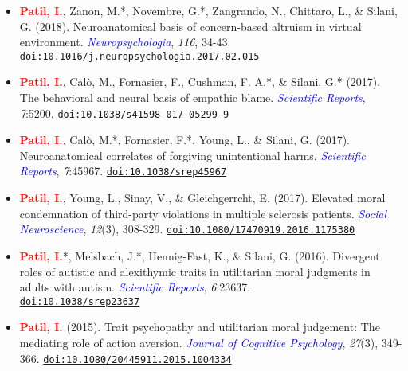 \documentclass[10pt]{article}
\begin{document}
\begin{itemize}
	\item \textbf{\textcolor{red}{Patil, I.}}, Zanon, M.*, Novembre, G.*, Zangrando, N., Chittaro, L., \& Silani, G. (2018). Neuroanatomical basis of concern-based altruism in virtual environment. \textit{\textcolor{blue}{Neuropsychologia}}, \textit{116}, 34-43. \href{https://drive.google.com/open?id=0B6_u70YpdJKnWU0zblpBOUMxRXc}{\tt doi:10.1016/j.neuropsychologia.2017.02.015}
		
	\item \textbf{\textcolor{red}{Patil, I.}}, Cal\`{o}, M., Fornasier, F., Cushman, F. A.*, \& Silani, G.* (2017). The behavioral and neural basis of empathic blame. 
 \textit{\textcolor{blue}{Scientific Reports}}, \textit{7}:5200. \href{https://drive.google.com/open?id=0B6_u70YpdJKnT1J6dkk5R1NPZDg}{\tt doi:10.1038/s41598-017-05299-9}
	
	\item \textbf{\textcolor{red}{Patil, I.}}, Cal\`{o}, M.*, Fornasier, F.*, Young, L., \& Silani, G. (2017). Neuroanatomical correlates of forgiving unintentional harms. \textit{\textcolor{blue}{Scientific Reports}}, \textit{7}:45967. \href{https://drive.google.com/open?id=0B6_u70YpdJKnRV81UnNlZHdrdXM}{\tt doi:10.1038/srep45967}
	
	\item \textbf{\textcolor{red}{Patil, I.}}, Young, L., Sinay, V., \& Gleichgerrcht, E. (2017). Elevated moral condemnation of third-party violations in multiple sclerosis patients. \textit{\textcolor{blue}{Social Neuroscience}}, \textit{12}(3), 308-329. \href{https://drive.google.com/open?id=0B6_u70YpdJKnT3M0bWpPdDY4RHc}{\tt doi:10.1080/17470919.2016.1175380}
	
	\item \textbf{\textcolor{red}{Patil, I.}}*, Melsbach, J.*, Hennig-Fast, K., \& Silani, G. (2016). Divergent roles of autistic and alexithymic traits in utilitarian moral judgments in adults with autism. \textit{\textcolor{blue}{Scientific Reports}}, \textit{6}:23637.\\
	\href{https://drive.google.com/file/d/0B6_u70YpdJKnV1p2UmNwa09iS1k/view?usp=sharing}{\tt doi:10.1038/srep23637}
	
	\item \textbf{\textcolor{red}{Patil, I.}} (2015). Trait psychopathy and utilitarian moral judgement: The mediating role of action aversion. \textit{\textcolor{blue}{Journal of Cognitive Psychology}}, \textit{27}(3), 349-366. \href{https://drive.google.com/file/d/0B6_u70YpdJKnQjVJUFgtR2ZmWTVqZGxRMEFfemVIOUVuME5Z/view?usp=sharing}{\tt doi:10.1080/20445911.2015.1004334}
	

\end{itemize}
\end{document}
